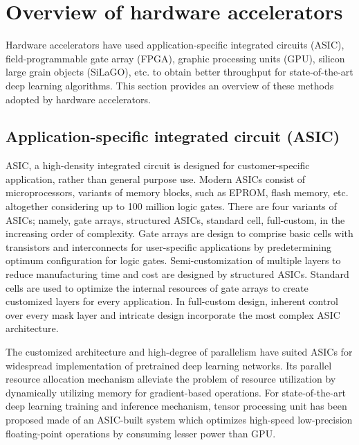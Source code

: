 \documentclass[journal]{IEEEtran}
\begin{document}
\section{Overview of hardware accelerators}
Hardware accelerators have used application-specific integrated circuits (ASIC), field-programmable gate array (FPGA), graphic processing units (GPU), silicon large grain objects (SiLaGO), etc. to obtain better throughput for state-of-the-art deep learning algorithms. This section provides an overview of these methods adopted by hardware accelerators.

\subsection{Application-specific integrated circuit (ASIC)}
ASIC, a high-density integrated circuit is designed for customer-specific application, rather than general purpose use. Modern ASICs consist of microprocessors, variants of memory blocks, such as EPROM, flash memory, etc. altogether considering up to 100 million logic gates. There are four variants of ASICs; namely, gate arrays, structured ASICs, standard cell, full-custom, in the increasing order of complexity. Gate arrays are design to comprise basic cells with transistors and interconnects for user-specific applications by predetermining optimum configuration for logic gates. Semi-customization of multiple layers to reduce manufacturing time and cost are designed by structured ASICs. Standard cells are used to optimize the internal resources of gate arrays to create customized layers for every application. In full-custom design, inherent control over every mask layer and intricate design incorporate the most complex ASIC architecture.

\par The customized architecture and high-degree of parallelism have suited ASICs for widespread implementation of pretrained deep learning networks. Its parallel resource allocation mechanism alleviate the problem of resource utilization by dynamically utilizing memory for gradient-based operations. For state-of-the-art deep learning training and inference mechanism, tensor processing unit has been proposed made of an ASIC-built system which optimizes high-speed low-precision floating-point operations by consuming lesser power than GPU.
\end{document}
